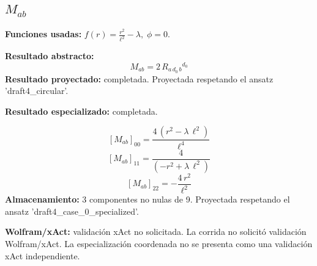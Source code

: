 \documentclass[11pt]{article}
\begin{document}
\subsection*{$ M_{ab} $}
\textbf{Funciones usadas:} $ f\!\left(r\right) = \frac{{r}^{2}}{{\ell}^{2}} - \lambda,\;\phi=0 $.\par
\textbf{Resultado abstracto:}
\begin{dmath*}[breakdepth={5}]
M_{ab} = 2\,R{}_{a\,d_{0}\,b}{}^{d_{0}}
\end{dmath*}
\textbf{Resultado proyectado:} completada. Proyectada respetando el ansatz 'draft4\_circular'.\par
\textbf{Resultado especializado:} completada.\par
\begin{dmath*}[breakdepth={5}]
\left[M_{ab}\right]_{00} = \frac{4\,\left({r}^{2} - \lambda\,{\ell}^{2}\right)}{{\ell}^{4}}
\end{dmath*}
\begin{dmath*}[breakdepth={5}]
\left[M_{ab}\right]_{11} = \frac{4}{\left(-{r}^{2} + \lambda\,{\ell}^{2}\right)}
\end{dmath*}
\begin{dmath*}[breakdepth={5}]
\left[M_{ab}\right]_{22} = -\frac{4\,{r}^{2}}{{\ell}^{2}}
\end{dmath*}
\textbf{Almacenamiento:} 3 componentes no nulas de 9. Proyectada respetando el ansatz 'draft4\_case\_0\_specialized'.\par
\textbf{Wolfram/xAct:} validación xAct no solicitada. La corrida no solicitó validación Wolfram/xAct. La especialización coordenada no se presenta como una validación xAct independiente.\par\medskip
{}
\end{document}
